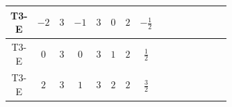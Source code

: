 \documentclass[8pt]{article}
\begin{document}
\begin{landscape}
\begin{longtable}{@{}cccccccc >{\raggedright\arraybackslash}p{0.21\linewidth} >{\raggedright\arraybackslash}p{0.21\linewidth} >{\raggedright\arraybackslash}p{0.21\linewidth}@{}}
\midrule
T3-E & $-2$ & $3$ & $-1$ & $3$ & $0$ & $2$ & $-\frac{1}{2}$ & \scriptsize\adjustbox{max width=\linewidth}{$\begin{gathered} +D_{\mu _1}\left(S_{2,j_1}\right){}^{\dagger } D_{\mu _1}\left(S_{2,j_1}\right)\end{gathered}$} & \scriptsize\adjustbox{max width=\linewidth}{$\begin{gathered} -\overline{F_{j_1,r_1}}\, F_{j_1,r_1} M_F\end{gathered}$} & \scriptsize\adjustbox{max width=\linewidth}{$\begin{gathered} +i \overline{F_{j_1,r_1}}\, \gamma ^{\mu _1}\, D_{\mu _1}\left(F_{j_1,r_1}\right)\end{gathered}$} \\
\midrule
T3-E & $0$ & $3$ & $0$ & $3$ & $1$ & $2$ & $\frac{1}{2}$ & \scriptsize\adjustbox{max width=\linewidth}{$\begin{gathered} +D_{\mu _1}\left(S_{2,j_1}\right){}^{\dagger } D_{\mu _1}\left(S_{2,j_1}\right)\end{gathered}$} & \scriptsize\adjustbox{max width=\linewidth}{$\begin{gathered} -\overline{F_{j_1,r_1}}\, F_{j_1,r_1} M_F\end{gathered}$} & \scriptsize\adjustbox{max width=\linewidth}{$\begin{gathered} +i \overline{F_{j_1,r_1}}\, \gamma ^{\mu _1}\, D_{\mu _1}\left(F_{j_1,r_1}\right)\end{gathered}$} \\
\midrule
T3-E & $2$ & $3$ & $1$ & $3$ & $2$ & $2$ & $\frac{3}{2}$ & \scriptsize\adjustbox{max width=\linewidth}{$\begin{gathered} +D_{\mu _1}\left(S_{2,j_1}\right){}^{\dagger } D_{\mu _1}\left(S_{2,j_1}\right)\end{gathered}$} & \scriptsize\adjustbox{max width=\linewidth}{$\begin{gathered} -\overline{F_{j_1,r_1}}\, F_{j_1,r_1} M_F\end{gathered}$} & \scriptsize\adjustbox{max width=\linewidth}{$\begin{gathered} +i \overline{F_{j_1,r_1}}\, \gamma ^{\mu _1}\, D_{\mu _1}\left(F_{j_1,r_1}\right)\end{gathered}$} \\
\midrule
\bottomrule
\end{longtable}
\clearpage

\end{landscape}
\end{document}
